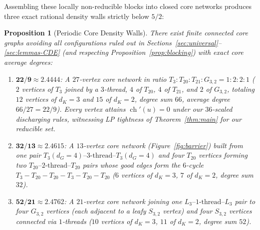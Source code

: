 \documentclass[11pt,a4paper]{article}
\newtheorem{proposition}[theorem]{Proposition}
\theoremstyle{definition}
\newcommand{\ch}{\operatorname{ch}}
\begin{document}
Assembling these locally non-reducible blocks into closed core networks produces three exact rational density walls strictly below $5/2$:

\begin{proposition}[Periodic Core Density Walls]\label{prop:walls}
There exist finite connected core graphs avoiding all configurations ruled out in Sections~\ref{sec:universal}--\ref{sec:lemmas-CDE} (and respecting Proposition~\ref{prop:blocking}) with exact core average degrees:
\begin{enumerate}[label=(\alph*),leftmargin=*,itemsep=2pt]
  \item $\mathbf{22/9 \approx 2.4444}$: A $27$-vertex core network in ratio $T_3 : T_{20} : T_{21} : G_{3,2} = 1 : 2 : 2 : 1$ ($2$ vertices of $T_3$ joined by a $3$-thread, $4$ of $T_{20}$, $4$ of $T_{21}$, and $2$ of $G_{3,2}$, totaling $12$ vertices of $d_K = 3$ and $15$ of $d_K = 2$, degree sum $66$, average degree $66/27 = 22/9$). Every vertex attains $\ch'(u) = 0$ under our $36$-scaled discharging rules, witnessing LP tightness of Theorem~\ref{thm:main} for our reducible set.
  \item $\mathbf{32/13 \approx 2.4615}$: A $13$-vertex core network (Figure~\ref{fig:barrier}) built from one pair $T_3(d_G=4)\text{--}3\text{-thread--}T_3(d_G=4)$ and four $T_{20}$ vertices forming two $T_{20}\text{--}2\text{-thread--}T_{20}$ pairs whose good edges form the $6$-cycle $T_3 - T_{20} - T_{20} - T_3 - T_{20} - T_{20}$ ($6$ vertices of $d_K=3$, $7$ of $d_K=2$, degree sum $32$).
  \item $\mathbf{52/21 \approx 2.4762}$: A $21$-vertex core network joining one $L_3\text{--}1\text{-thread--}L_3$ pair to four $G_{3,2}$ vertices (each adjacent to a leafy $S_{3,2}$ vertex) and four $S_{3,2}$ vertices connected via $1$-threads ($10$ vertices of $d_K=3$, $11$ of $d_K=2$, degree sum $52$).
\end{enumerate}
\end{proposition}
\end{document}
